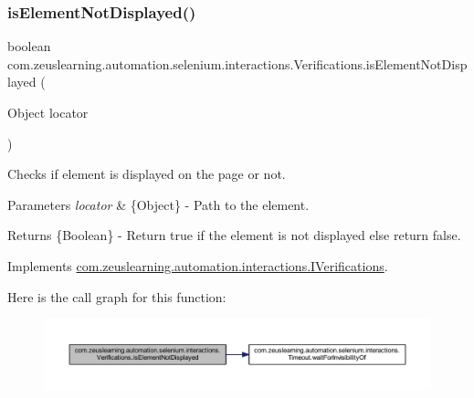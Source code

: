 \subsubsection{\texorpdfstring{is\+Element\+Not\+Displayed()}{isElementNotDisplayed()}\hspace{0.1cm}{\footnotesize\ttfamily [1/2]}}
{\footnotesize\ttfamily boolean com.\+zeuslearning.\+automation.\+selenium.\+interactions.\+Verifications.\+is\+Element\+Not\+Displayed (\begin{DoxyParamCaption}\item[{Object}]{locator }\end{DoxyParamCaption})\hspace{0.3cm}{\ttfamily [inline]}}

Checks if element is displayed on the page or not.


\begin{DoxyParams}{Parameters}
{\em locator} & \{Object\} -\/ Path to the element. \\
\hline
\end{DoxyParams}
\begin{DoxyReturn}{Returns}
\{Boolean\} -\/ Return {\ttfamily true} if the element is not displayed else return false. 
\end{DoxyReturn}


Implements \hyperlink{interfacecom_1_1zeuslearning_1_1automation_1_1interactions_1_1IVerifications_aac95057ff56c12e2a3929b60a585fdcb}{com.\+zeuslearning.\+automation.\+interactions.\+I\+Verifications}.

Here is the call graph for this function\+:
\nopagebreak
\begin{figure}[H]
\begin{center}
\leavevmode
\includegraphics[width=350pt]{d2/d6b/classcom_1_1zeuslearning_1_1automation_1_1selenium_1_1interactions_1_1Verifications_ab6c1a1245269d660bdcd26eff9ac35ad_cgraph}
\end{center}
\end{figure}
\hypertarget{classcom_1_1zeuslearning_1_1automation_1_1selenium_1_1interactions_1_1Verifications_a5b51bdfb17dbfd284572253189f54fb4}{}\label{classcom_1_1zeuslearning_1_1automation_1_1selenium_1_1interactions_1_1Verifications_a5b51bdfb17dbfd284572253189f54fb4} 
